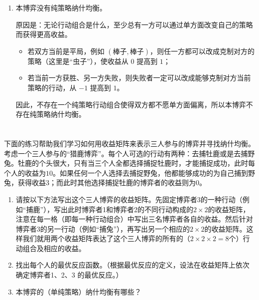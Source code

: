 \documentclass[12pt,a4paper]{article}
\begin{document}
\begin{enumerate}[label=\alph*.]
  \item
  本博弈没有纯策略纳什均衡。

  原因是：无论行动组合是什么，至少总有一方可以通过单方面改变自己的策略而获得更高收益。

  \begin{itemize}
    \item 若双方当前是平局，例如 \((\text{棒子},\text{棒子})\)，则任一方都可以改成克制对方的策略（这里是``虫子''），使收益从 \(0\) 提高到 \(1\)；
    \item 若当前一方获胜、另一方失败，则失败者一定可以改成能够克制对方当前策略的行动，从 \(-1\) 提高到 \(1\)。
  \end{itemize}

  因此，不存在一个纯策略行动组合使得双方都不愿单方面偏离，所以本博弈不存在纯策略纳什均衡。
\end{enumerate}

\section{}
下面的练习帮助我们学习如何用收益矩阵来表示三人参与的博弈并寻找纳什均衡。考虑一个三人参与的``猎鹿博弈''。每个人可选的行动有两种：去捕牡鹿或是去捕野兔。牡鹿的个头很大，只有当三个人全都选择捕捉牡鹿时，才能捕捉成功，此时每个人的收益为$10$。如果任何一个人选择去捕捉野兔，他都能够成功的为自己捕到野兔，获得收益$3$；而此时其他选择捕捉牡鹿的博弈者的收益则为$0$。

\begin{enumerate}[label=\alph*.]
  \item 请按以下方法写出这个三人博弈的收益矩阵。先固定博弈者3的一种行动（例如``捕鹿''），写出此时博弈者1和博弈者2的不同行动构成的$2\times2$的收益矩阵，注意在每一格（即每一种行动组合）中写出三名博弈者各自的收益。然后针对博弈者3的另一行动（例如``捕兔''），再写出另一个相应的$2\times2$的收益矩阵。这样我们就用两个收益矩阵表达了这个三人博弈的所有的（$2\times2\times2=8$个）行动组合及相应的收益。
  \item 找出每个人的最优反应函数。（根据最优反应的定义，设法在收益矩阵上依次确定博弈者1、2、3 的最优反应。）
  \item 本博弈的（单纯策略）纳什均衡有哪些？
\end{enumerate}
\end{document}
